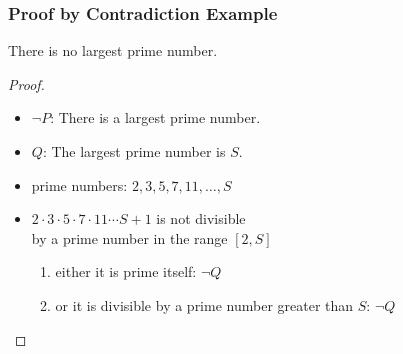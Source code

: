 \documentclass[dvipsnames]{beamer}
\begin{document}
\begin{frame}
  \frametitle{Proof by Contradiction Example}

  \begin{theorem}
    There is no largest prime number.
  \end{theorem}

  \pause
  \begin{proof}
    \begin{itemize}
      \item $\neg P$: There is a largest prime number.

      \pause
      \item $Q$: The largest prime number is $S$.

      \pause
      \item prime numbers: $2,3,5,7,11,\dots,S$

      \pause
      \item $2 \cdot 3 \cdot 5 \cdot 7 \cdot 11 \cdots S + 1$ is not divisible\\
        by a prime number in the range $[2, S]$
      \pause
      \begin{enumerate}
        \item either it is prime itself: $\neg Q$

        \pause
        \item or it is divisible by a prime number greater than $S$: $\neg Q$
      \end{enumerate}
    \end{itemize}
  \end{proof}
\end{frame}
\end{document}
